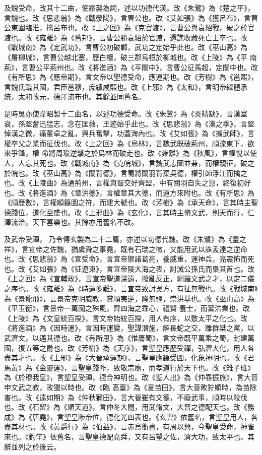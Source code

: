 \begin{pinyinscope}
 及魏受命，改其十二曲，使繆襲為詞，述以功德代漢。改《朱鷺》為《楚之平》，言魏也。改《思悲翁》為《戰滎陽》，言曹公也。改《艾如張》為《獲呂布》，言曹公東圍臨淮，擒呂布也。改《上之回》為《克官渡》，言曹公與袁紹戰，破之於官渡也。改《雍離》為《舊邦》，言曹公勝袁紹於官渡，還譙收藏死亡士卒也。改《戰城南》為《定武功》，言曹公初破鄴，武功之定始乎此也。改《巫山高》為《屠柳城》，言曹公越北塞，歷白檀，破三郡烏桓於柳城也。改《上陵》為《平
 南荊》，言曹公平荊州也。改《將進酒》為《平關中》，言曹公征馬超，定關中也。改《有所思》為《應帝期》，言文帝以聖德受命，應運期也。改《芳樹》為《邕熙》，言魏氏臨其國，君臣邕穆，庶績咸熙也。改《上邪》為《太和》，言明帝繼體承統，太和改元，德澤流布也。其餘並同舊名。



 是時吳亦使韋昭製十二曲名，以述功德受命。改《朱鷺》為《炎精缺》，言漢室衰，孫堅奮迅猛志，念在匡救，王迹始乎此也。改《思悲翁》為《漢之季》，言堅悼漢之微，痛董卓之亂，興兵奮擊，功蓋海內也。改《艾如張》為《攄武師》，言權卒父之業而征伐也。改《上之回》為《烏林》，言魏武既破荊州，順流東下，欲來爭鋒，權
 命將周瑜逆擊之於烏林而破走也。改《雍離》為《秋風》，言權悅以使人，人忘其死也。改《戰城南》為《克皖城》，言魏武志圖並兼，而權親征，破之於皖也。改《巫山高》為《關背德》，言蜀將關羽背棄吳德，權引師浮江而擒之也。改《上陵曲》為通荊州，言權與蜀交好齊盟，中有關羽自失之愆，終復初好也。改《將進酒》為《章洪德》，言權章其大德，而遠方來附也。改《有所思》為《順歷數》，言權順籙圖之符，而建大號也。改《芳樹》為《承天命》，言其時主聖德踐位，道化至盛也。改《上邪曲》為《玄化》，言其時主脩文武，則天而行，仁澤流洽，天下喜樂也。其餘亦用舊名不改。



 及武帝受禪，
 乃令傅玄製為二十二篇，亦述以功德代魏。改《朱鷺》為《靈之祥》，言宣帝之佐魏，猶虞舜之事堯，既有石瑞之徵，又能用武以誅孟達之逆命也。改《思悲翁》為《宣受命》，言宣帝禦諸葛亮，養威重，運神兵，亮震怖而死也。改《艾如張》為《征遼東》，言宣帝陵大海之表，討滅公孫氏而梟其首也。改《上之回》為《宣輔政》，言宣帝聖道深遠，撥亂反正，網羅文武之才，以定二儀之序也。改《雍離》為《時運多難》，言宣帝致討吳方，有征無戰也。改《戰城南》為《景龍飛》，言景帝克明威教，賞順夷逆，隆無疆，崇洪基也。改《巫山高》為《平玉衡》，言景帝一萬國之殊風，齊四海之乖心，禮賢
 養士，而纂洪業也。改《上陵》為《文皇統百揆》，言文帝始統百揆，用人有序，以敷太平之化也。改《將進酒》為《因時運》，言因時運變，聖謀潛施，解長蛇之交，離群桀之黨，以武濟文，以邁其德也。改《有所思》為《惟庸蜀》，言文帝既平萬乘之蜀，封建萬國，復五等之爵也。改《芳樹》為《天序》，言聖皇應歷受禪，弘濟大化，用人各盡其才也。改《上邪》為《大晉承運期》，言聖皇應籙受圖，化象神明也。改《君馬黃》為《金靈運》，言聖皇踐阼，致敬宗廟，而孝道行於天下也。改《雉子班》為《於穆我皇》，言聖皇受禪，德合神明也。改《聖人出》為《仲春振旅》，言大晉申文武之教，畋獵以時也。改《臨
 高臺》為《夏苗田》，言大晉畋狩順時，為苗除害也。改《遠如期》為《仲秋獮田》，言大晉雖有文德，不廢武事，順時以殺伐也。改《石留》為《順天道》，言仲冬大閱，用武脩文，大晉之德配天也。改《務成》為《唐堯》，言聖皇陟帝位，德化光四表也。《玄雲》依舊名，言聖皇用人，各盡其材也。改《黃爵行》為《伯益》，言赤烏銜書，有周以興，今聖皇受命，神雀來也。《釣竿》依舊名，言聖皇德配堯舜，又有呂望之佐，濟大功，致太平也。其辭並列之於後云。




\end{pinyinscope}
